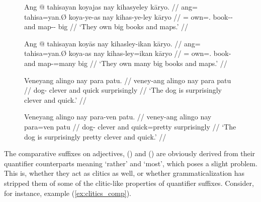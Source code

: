 \begin{figure}
\pex\label{ex:clitics_61}
\a\label{ex:clitics_61a}\begingl
	\gla Ang @ tahisayan koyajas nay kihasyeley kāryo. //
	\glb ang= tahisa=yan.Ø koya-ye-as nay kihas-ye-ley kāryo //
	\glc \AgtT{}= own=\TplM{}.\Top{} book-\Pl{}-\Parg{} and map-\Pl{}-\PargI{}
		big //
	\glft `They own big books and maps.' //
\endgl

\a\label{ex:clitics_61b}\begingl
	\gla Ang @ tahisayan koyās nay kihasley-ikan kāryo. //
	\glb ang= tahisa=yan.Ø koya-as nay kihas-ley=ikan kāryo //
	\glc \AgtT{}= own=\TplM{}.\Top{} book-\Parg{} and map-\PargI{}=many 
		big //
	\glft `They own many big books and maps.' //
\endgl
\xe
\end{figure}

\begin{figure}[h]
\pex\label{ex:clitics_62}
\a\label{ex:clitics_62a}\begingl
	\gla Veneyang alingo nay para patu. //
	\glb veney-ang alingo nay para patu //
	\glc dog-\Aarg{} clever and quick surprisingly //
	\glft `The dog is surprisingly clever and quick.' //
\endgl

\a\label{ex:clitics_62b}\begingl
	\gla Veneyang alingo nay para-ven patu. //
	\glb veney-ang alingo nay para=ven patu //
	\glc dog-\Aarg{} clever and quick=pretty surprisingly //
	\glft `The dog is surprisingly pretty clever and quick.' //
\endgl
\xe
\end{figure}

The comparative suffixes on adjectives,  (\Comp{}) and
 (\Supl{}) are obviously derived from their quantifier
counterparts meaning `rather' and `most', which poses a slight problem. This
is, whether they act as clitics as well, or whether grammaticalization has
stripped them of some of the clitic-like properties of quantifier suffixes.
Consider, for instance, example (\ref{ex:clitics_comp}).

